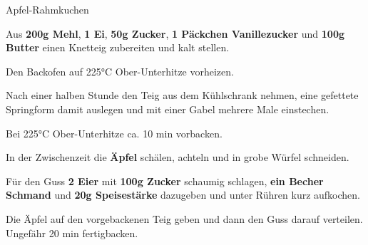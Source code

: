 \begin{recipe}[]{Apfel-Rahmkuchen} %
	\personcount{} %

\step
Aus \textbf{200g Mehl}, \textbf{1 Ei}, \textbf{50g Zucker}, \textbf{1 Päckchen Vanillezucker} und \textbf{100g Butter} einen Knetteig zubereiten und kalt stellen.

\step
Den Backofen auf 225°C Ober-Unterhitze vorheizen.

\step
Nach einer halben Stunde den Teig aus dem Kühlschrank nehmen, eine gefettete Springform damit auslegen und mit einer Gabel mehrere Male einstechen.

\step 
Bei 225°C Ober-Unterhitze ca. 10 min vorbacken.

\step
In der Zwischenzeit die \textbf{Äpfel} schälen, achteln und in grobe Würfel schneiden.

\step
Für den Guss \textbf{2 Eier} mit \textbf{100g Zucker} schaumig schlagen, \textbf{ein Becher Schmand} und \textbf{20g Speisestärke} dazugeben und unter Rühren kurz aufkochen.

\step
Die Äpfel auf den vorgebackenen Teig geben und dann den Guss darauf verteilen. Ungefähr 20 min fertigbacken.


\end{recipe}